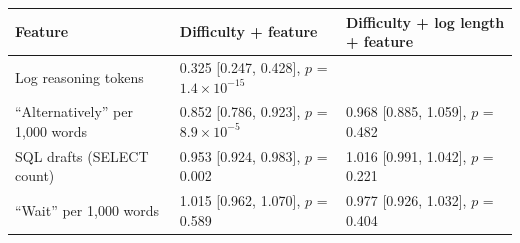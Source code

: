 \begin{tabular}{@{}l ll@{}}
\toprule
Feature & Difficulty + feature & Difficulty + log length + feature \\
\midrule
Log reasoning tokens & 0.325 [0.247, 0.428], $p$ = $1.4\times10^{-15}$ &  \\
``Alternatively'' per 1,000 words & 0.852 [0.786, 0.923], $p$ = $8.9\times10^{-5}$ & 0.968 [0.885, 1.059], $p$ = 0.482 \\
SQL drafts (SELECT count) & 0.953 [0.924, 0.983], $p$ = 0.002 & 1.016 [0.991, 1.042], $p$ = 0.221 \\
``Wait'' per 1,000 words & 1.015 [0.962, 1.070], $p$ = 0.589 & 0.977 [0.926, 1.032], $p$ = 0.404 \\
\bottomrule
\end{tabular}

